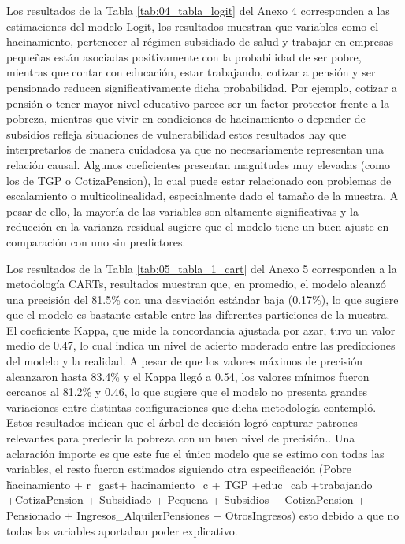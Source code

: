 \documentclass[12pt,a4paper,onecolumn]{article}
\begin{document}
Los resultados de la Tabla \ref{tab:04_tabla_logit} del Anexo 4 corresponden a las estimaciones del modelo Logit, los resultados muestran que variables como el hacinamiento, pertenecer al régimen subsidiado de salud y trabajar en empresas pequeñas están asociadas positivamente con la probabilidad de ser pobre, mientras que contar con educación, estar trabajando, cotizar a pensión y ser pensionado reducen significativamente dicha probabilidad. Por ejemplo, cotizar a pensión o tener mayor nivel educativo parece ser un factor protector frente a la pobreza, mientras que vivir en condiciones de hacinamiento o depender de subsidios refleja situaciones de vulnerabilidad estos resultados hay que interpretarlos de manera cuidadosa ya que no necesariamente representan una relación causal. Algunos coeficientes presentan magnitudes muy elevadas (como los de TGP o CotizaPension), lo cual puede estar relacionado con problemas de escalamiento o multicolinealidad, especialmente dado el tamaño de la muestra. A pesar de ello, la mayoría de las variables son altamente significativas y la reducción en la varianza residual sugiere que el modelo tiene un buen ajuste en comparación con uno sin predictores.

Los resultados de la Tabla \ref{tab:05_tabla_1_cart} del Anexo 5 corresponden a la metodología CARTs, resultados muestran que, en promedio, el modelo alcanzó una precisión del 81.5\% con una desviación estándar baja (0.17\%), lo que sugiere que el modelo es bastante estable entre las diferentes particiones de la muestra. El coeficiente Kappa, que mide la concordancia ajustada por azar, tuvo un valor medio de 0.47, lo cual indica un nivel de acierto moderado entre las predicciones del modelo y la realidad. A pesar de que los valores máximos de precisión alcanzaron hasta 83.4\% y el Kappa llegó a 0.54, los valores mínimos fueron cercanos al 81.2\% y 0.46, lo que sugiere que el modelo no presenta grandes variaciones entre distintas configuraciones que dicha metodología contempló. Estos resultados indican que el árbol de decisión logró capturar patrones relevantes para predecir la pobreza con un buen nivel de precisión.. Una aclaración importe es que este fue el único modelo que se estimo con todas las variables, el resto fueron estimados siguiendo otra especificación (Pobre \~ hacinamiento + r\_gast+ hacinamiento\_c + TGP +educ\_cab +trabajando +CotizaPension + Subsidiado + Pequena + Subsidios + CotizaPension + Pensionado + Ingresos\_AlquilerPensiones + OtrosIngresos) esto debido a que no todas las variables aportaban poder explicativo.
\end{document}
